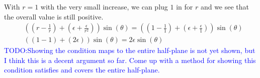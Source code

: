 \documentclass{article}
\newcommand{\todo}[1]{\textcolor{blue}{TODO:#1}}
\begin{document}
With $r = 1$ with the very small increase, we can plug $1$ in for $r$ and we see that the overall value is still positive.
\begin{align*}
	 & \left(\left(r - \frac{1}{r}\right)+ \left(\epsilon  + \frac{\epsilon}{r^2}\right)\right)\sin{(\theta)} = \left(\left(1 - \frac{1}{1}\right)+ \left(\epsilon  + \frac{\epsilon}{1}\right)\right)\sin{(\theta)} \\
	 & \left((1-1)+ (2\epsilon)\right)\sin{(\theta)} = 2\epsilon\sin{(\theta)}
\end{align*}
\todo{Showing the condition maps to the entire half-plane is not yet shown, but I think this is a decent argument so far. Come up with a method for showing this condition satisfies and covers the entire half-plane.}


\end{document}
